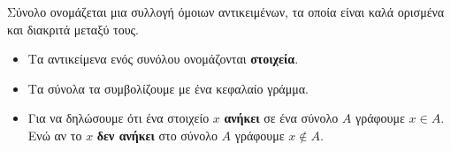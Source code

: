 Σύνολο ονομάζεται μια συλλογή όμοιων αντικειμένων, τα οποία είναι καλά ορισμένα και διακριτά μεταξύ τους.
\begin{itemize}[itemsep=0mm]
\item Τα αντικείμενα ενός συνόλου ονομάζονται \textbf{στοιχεία}.
\item Τα σύνολα τα συμβολίζουμε με ένα κεφαλαίο γράμμα.
\item Για να δηλώσουμε ότι ένα στοιχείο $ x $ \textbf{ανήκει} σε ένα σύνολο $ A $ γράφουμε $ x\in A $. Ενώ αν το $ x $ \textbf{δεν ανήκει} στο σύνολο $ A $ γράφουμε $ x\notin A $.
\end{itemize}
